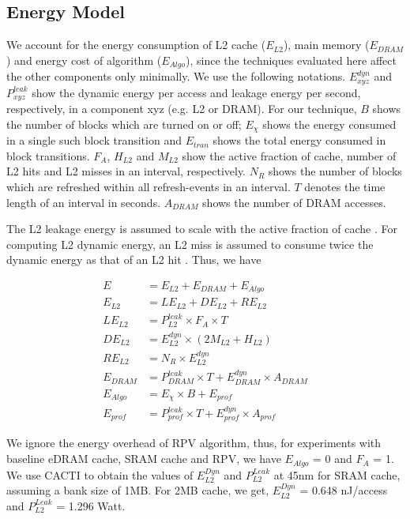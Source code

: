  
 \subsection{Energy Model}\label{sec:energymodel}
We account for the energy consumption of L2 cache ($E_{L2}$), main memory ($E_{DRAM}$) and energy cost of algorithm ($E_{Algo}$), since the techniques evaluated here affect the other components only minimally. We use the following notations. $E^{dyn}_{xyz}$ and $P^{leak}_{xyz}$ show the dynamic energy per access and leakage energy per second, respectively, in a component xyz (e.g. L2 or DRAM). For our technique, $B$ shows the number of blocks which are turned on or off; $E_{\chi}$ shows the energy consumed in a single such block transition and $E_{tran}$ shows the total energy consumed in block transitions. $F_A$,  $H_{L2}$ and $M_{L2}$ show the active fraction of cache, number of L2 hits and L2 misses in an interval,  respectively.  $N_R$ shows the number of blocks which are refreshed within all refresh-events in an interval. $T$ denotes the time length of an interval in seconds. $A_{DRAM}$ shows the number of DRAM accesses.  

The L2 leakage energy is assumed to scale with the active fraction of cache 
\cite{mittal2013PhDThesis}. For computing L2 dynamic energy, an L2 miss is 
assumed to consume twice the dynamic energy as that of an L2 hit 
\cite{mittal2013PhDThesis}.  Thus, we have 

\begin{align}
 \label{eq:totalenergy}E&= E_{L2}+E_{DRAM}+E_{Algo} \\
 E_{L2} &= LE_{L2} + DE_{L2} +RE_{L2}  \\   
 LE_{L2} &= P^{leak}_{L2}\times F_{A} \times T \\
DE_{L2} &= E^{dyn}_{L2}\times(2 M_{L2}+H_{L2}) \\
RE_{L2} &= N_R \times E^{dyn}_{L2} \\
E_{DRAM} &= P^{leak}_{DRAM}\times T + E^{dyn}_{DRAM}\times A_{DRAM} \\
E_{Algo} &= E_{\chi}\times B + E_{prof}\\
E_{prof} &= P^{leak}_{prof} \times T + E^{dyn}_{prof} \times A_{prof}
\end{align}

We ignore the energy overhead of RPV algorithm, thus, for experiments with 
baseline eDRAM cache, SRAM cache and RPV, we have $E_{Algo}$ = 0 and $F_A$ = 1. 
We use CACTI \cite{cacti_53} to obtain the values of $E^{Dyn}_{L2}$ and 
$P^{Leak}_{L2}$  at 45nm for SRAM cache, assuming a bank size of 1MB. For 2MB 
cache, we get, $E^{Dyn}_{L2}$ = 0.648 nJ/access and  $P^{Leak}_{L2}$ = 1.296 
Watt. 



